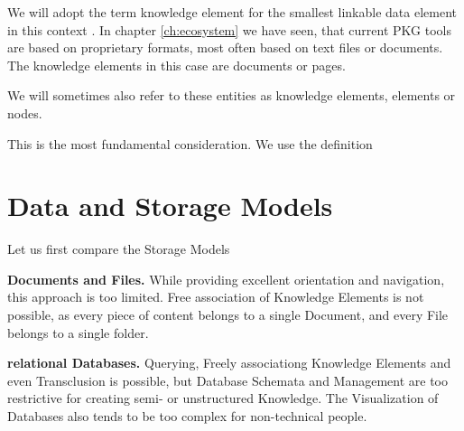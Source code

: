We will adopt the term knowledge element for the smallest linkable data element in this context \cite{Davies2005Memex60}. In chapter \ref{ch:ecosystem} we have seen, that current PKG tools are based on proprietary formats, most often based on text files or documents. The knowledge elements in this case are documents or pages. 





We will sometimes also refer to these entities as knowledge elements, elements or nodes.

This is the most fundamental consideration. We use the definition  

\section{Data and Storage Models}





Let us first compare the Storage Models

\textbf{Documents and Files.} While providing excellent orientation and navigation, this approach is too limited. Free association of Knowledge Elements is not possible, as every piece of content belongs to a single Document, and every File belongs to a single folder.

\textbf{relational Databases.} Querying, Freely associationg Knowledge Elements and even Transclusion is possible, but Database Schemata and Management are too restrictive for creating semi- or unstructured Knowledge. The Visualization of Databases also tends to be too complex for non-technical people.

